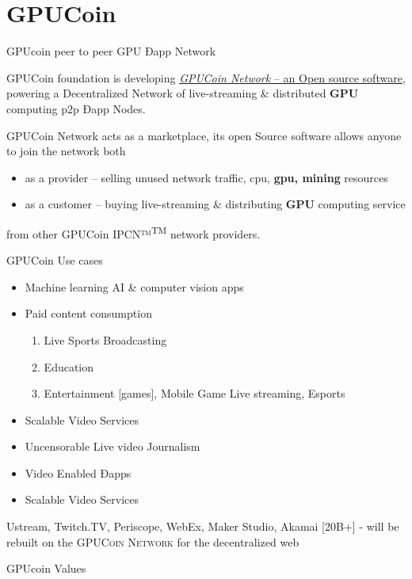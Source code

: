 \documentclass[10pt,handout]{beamer}
\begin{document}
\section{GPUCoin}
\begin{frame}[fragile]{ GPUcoin peer to peer GPU Ðapp Network }

GPUCoin foundation is developing \href{http://gpuco.in/}{\emph{GPUCoin Network} – an Open source software}, powering a Decentralized Network of live-streaming \& distributed \textbf{GPU} computing p2p Ðapp Nodes.
 
\pause
GPUCoin Network acts as a marketplace, its open Source software allows anyone to join the network both 

\begin{itemize}[<+-| alert@+>]
\item as a provider – selling unused network traffic, cpu, \textbf{gpu, mining} resources
\item as a customer – buying live-streaming \& distributing \textbf{GPU} computing service
\end{itemize}
 from other GPUCoin IPCN™\textsuperscript{TM} network providers. 
\end{frame}



\begin{frame}[fragile]{GPUCoin Use cases}
 \begin{itemize}[<+-| alert@+>]%
\item {Machine learning AI \& computer vision apps} 
\item {Paid content consumption}
\begin{enumerate}[<+-| alert@+>]
\item Live Sports Broadcasting
\item Education 
\item Entertainment [games], Mobile Game Live streaming, Esports
\end{enumerate}
\item {Scalable Video Services}
\item {Uncensorable Live video Journalism}
\item {Video Enabled Ðapps}
\item {Scalable Video Services}

\end{itemize}
\pause

\Large{
Ustream, Twitch.TV, Periscope, WebEx, Maker Studio, Akamai [20B+] - will be rebuilt on the \textsc{GPUCoin Network} for the decentralized web
}

\end{frame}
\begin{frame}[t]{GPUcoin Values}

\end{frame}
\end{document}
